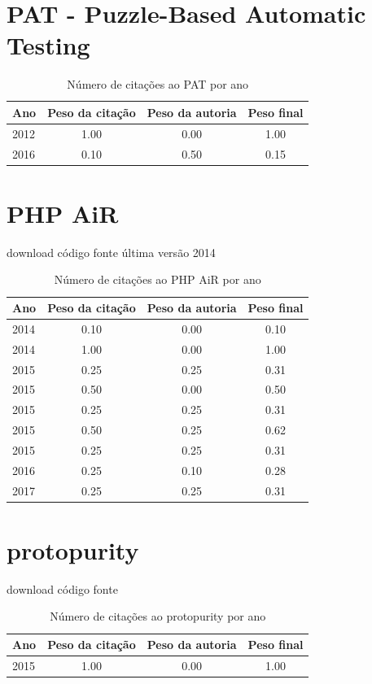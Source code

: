 \section{PAT - Puzzle-Based Automatic Testing}
\begin{table}[H]
\caption{Número de citações ao PAT  por ano}
\centering
\begin{tabular}{| l | c | c | c |}
  \hline
  Ano & Peso da citação & Peso da autoria & Peso final \\
  \hline
  2012
    & 1.00
    & 0.00
    & {\color{blue} 1.00} \\
\hline
  2016
    & 0.10
    & 0.50
    & {\color{red} 0.15} \\
\hline
\end{tabular}
\end{table}
\section{PHP AiR}
\checkmark download
\checkmark código fonte
\checkmark última versão 2014
\begin{table}[H]
\caption{Número de citações ao PHP AiR por ano}
\centering
\begin{tabular}{| l | c | c | c |}
  \hline
  Ano & Peso da citação & Peso da autoria & Peso final \\
  \hline
  2014
    & 0.10
    & 0.00
    & {\color{red} 0.10} \\
  2014
    & 1.00
    & 0.00
    & {\color{blue} 1.00} \\
\hline
  2015
    & 0.25
    & 0.25
    & {\color{red} 0.31} \\
  2015
    & 0.50
    & 0.00
    & {\color{blue} 0.50} \\
  2015
    & 0.25
    & 0.25
    & {\color{red} 0.31} \\
  2015
    & 0.50
    & 0.25
    & {\color{blue} 0.62} \\
  2015
    & 0.25
    & 0.25
    & {\color{red} 0.31} \\
\hline
  2016
    & 0.25
    & 0.10
    & {\color{red} 0.28} \\
\hline
  2017
    & 0.25
    & 0.25
    & {\color{red} 0.31} \\
\hline
\end{tabular}
\end{table}
\section{protopurity}
\checkmark download
\checkmark código fonte
\begin{table}[H]
\caption{Número de citações ao protopurity por ano}
\centering
\begin{tabular}{| l | c | c | c |}
  \hline
  Ano & Peso da citação & Peso da autoria & Peso final \\
  \hline
  2015
    & 1.00
    & 0.00
    & {\color{blue} 1.00} \\
\hline
\end{tabular}
\end{table}
